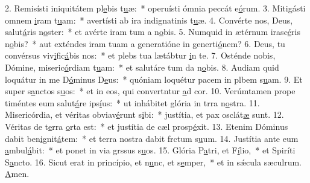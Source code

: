 2. Remisísti iniquitátem pl\uline{e}bis t\uline{u}æ:~* operuísti ómnia peccát e\uline{ó}rum.
3. Mitigásti omnem \uline{i}ram t\uline{u}am:~* avertísti ab ira indignatinis t\uline{u}æ.
4. Convérte nos, Deus, salut\uline{á}ris n\uline{o}ster:~* et avérte iram tum a n\uline{o}bis.
5. Numquid in ætérnum irasc\uline{é}ris n\uline{o}bis?~* aut exténdes iram tuam a generatióne in generti\uline{ó}nem?
6. Deus, tu convérsus viv\uline{i}fic\uline{á}bis nos:~* et plebs tua lætábtur \uline{i}n te.
7. Osténde nobis, Dómine, miseric\uline{ó}rdiam t\uline{u}am:~* et salutáre tum da n\uline{o}bis.
8. Audiam quid loquátur in me D\uline{ó}minus D\uline{e}us:~* quóniam loquétur pacem in plbem s\uline{u}am.
9. Et super s\uline{a}nctos s\uline{u}os:~* et in eos, qui convertntur \uline{a}d cor.
10. Verúmtamen prope timéntes eum salut\uline{á}re ips\uline{í}us:~* ut inhábitet glória in trra n\uline{o}stra.
11. Misericórdia, et véritas obviav\uline{é}runt s\uline{i}bi:~* justítia, et pax osclát\uline{æ} sunt.
12. Véritas de t\uline{e}rra \uline{o}rta est:~* et justítia de cæl prosp\uline{é}xit.
13. Etenim Dóminus dabit ben\uline{i}gnit\uline{á}tem:~* et terra nostra dabit frctum s\uline{u}um.
14. Justítia ante eum \uline{a}mbul\uline{á}bit:~* et ponet in via grssus s\uline{u}os.
15. Glória P\uline{a}tri, et F\uline{í}lio,~* et Spiríti S\uline{a}ncto.
16. Sicut erat in princípio, et n\uline{u}nc, et s\uline{e}mper,~* et in sǽcula sæculrum. \uline{A}men.
